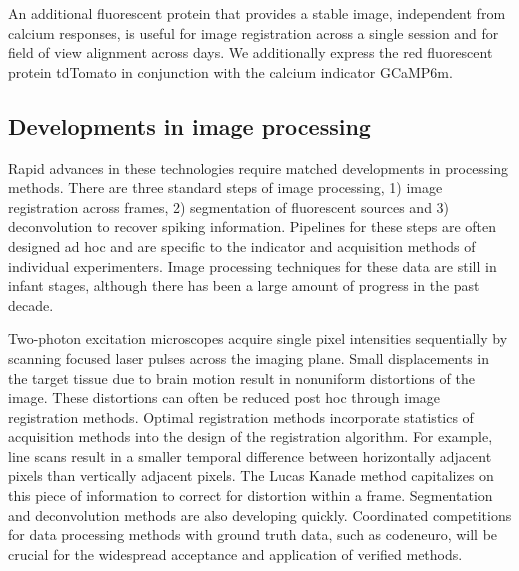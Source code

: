 \bigskip

An additional fluorescent protein that provides a stable image, independent from calcium responses, is useful for image registration across a single session and for field of view alignment across days. We additionally express the red fluorescent protein tdTomato in conjunction with the calcium indicator GCaMP6m.

\subsection{Developments in image processing}
Rapid advances in these technologies require matched developments in processing methods. There are three standard steps of image processing, 1) image registration across frames, 2) segmentation of fluorescent sources and 3) deconvolution to recover spiking information. Pipelines for these steps are often designed ad hoc and are specific to the indicator and acquisition methods of individual experimenters. Image processing techniques for these data are still in infant stages, although there has been a large amount of progress in the past decade. 

\bigskip

Two-photon excitation microscopes acquire single pixel intensities sequentially by scanning focused laser pulses across the imaging plane. Small displacements in the target tissue due to brain motion result in nonuniform distortions of the image. These distortions can often be reduced post hoc through image registration methods. Optimal registration methods incorporate statistics of acquisition methods into the design of the registration algorithm. For example, line scans result in a smaller temporal difference between horizontally adjacent pixels than vertically adjacent pixels. The Lucas Kanade method capitalizes on this piece of information to correct for distortion within a frame. Segmentation and deconvolution methods are also developing quickly. Coordinated competitions for data processing methods with ground truth data, such as codeneuro, will be crucial for the widespread acceptance and application of verified methods.

